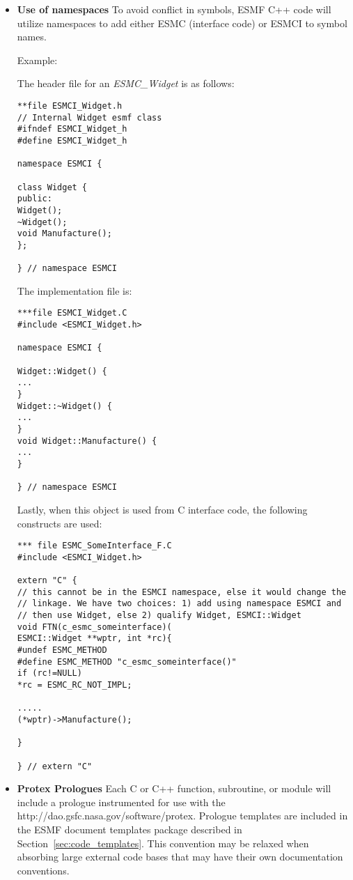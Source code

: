 \begin{itemize}
\item {\bf Use of namespaces}
To avoid conflict in symbols, ESMF C++ code will utilize namespaces to
add either ESMC (interface code) or ESMCI to symbol names.

Example: 

The header file for an {\it ESMC\_Widget} is as follows:
\begin{verbatim}
**file ESMCI_Widget.h
// Internal Widget esmf class
#ifndef ESMCI_Widget_h
#define ESMCI_Widget_h

namespace ESMCI {

class Widget {
public:
Widget();
~Widget();
void Manufacture();
};

} // namespace ESMCI
\end{verbatim}

The implementation file is:
\begin{verbatim}
***file ESMCI_Widget.C
#include <ESMCI_Widget.h>

namespace ESMCI {

Widget::Widget() {
...
}
Widget::~Widget() {
...
}
void Widget::Manufacture() {
...
}

} // namespace ESMCI
\end{verbatim}

Lastly, when this object is used from C interface code, the following constructs are used:

\begin{verbatim}
*** file ESMC_SomeInterface_F.C
#include <ESMCI_Widget.h>

extern "C" {
// this cannot be in the ESMCI namespace, else it would change the
// linkage. We have two choices: 1) add using namespace ESMCI and
// then use Widget, else 2) qualify Widget, ESMCI::Widget
void FTN(c_esmc_someinterface)(
ESMCI::Widget **wptr, int *rc){
#undef ESMC_METHOD
#define ESMC_METHOD "c_esmc_someinterface()"
if (rc!=NULL)
*rc = ESMC_RC_NOT_IMPL;

.....
(*wptr)->Manufacture();

}

} // extern "C"
\end{verbatim}

\item {\bf Protex Prologues}  Each C or C++ function, subroutine, or 
module will include a prologue instrumented for use with the
{http://dao.gsfc.nasa.gov/software/protex}.  Prologue templates are
included in the ESMF document templates package described in 
Section~\ref{sec:code_templates}.  This convention may be relaxed
when absorbing large external code bases that may have their own
documentation conventions.

\end{itemize}






